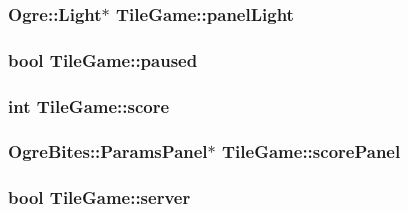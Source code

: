 \hypertarget{classTileGame_a23db72b0263e4d5595c1f170cc312185}{
\subsubsection[{panel\-Light}]{\setlength{\rightskip}{0pt plus 5cm}Ogre\-::\-Light$\ast$ Tile\-Game\-::panel\-Light\hspace{0.3cm}{\ttfamily [protected]}}}\label{classTileGame_a23db72b0263e4d5595c1f170cc312185}
\hypertarget{classTileGame_ac76eb85a5597f84146e49c92f7edc877}{
\subsubsection[{paused}]{\setlength{\rightskip}{0pt plus 5cm}bool Tile\-Game\-::paused\hspace{0.3cm}{\ttfamily [protected]}}}\label{classTileGame_ac76eb85a5597f84146e49c92f7edc877}
\hypertarget{classTileGame_abba0100f7c52d2a9ae1bfa0f5bbee4a5}{
\subsubsection[{score}]{\setlength{\rightskip}{0pt plus 5cm}int Tile\-Game\-::score\hspace{0.3cm}{\ttfamily [protected]}}}\label{classTileGame_abba0100f7c52d2a9ae1bfa0f5bbee4a5}
\hypertarget{classTileGame_a9a4d1b4dfacca55fdeacf454af04fa0c}{
\subsubsection[{score\-Panel}]{\setlength{\rightskip}{0pt plus 5cm}Ogre\-Bites\-::\-Params\-Panel$\ast$ Tile\-Game\-::score\-Panel\hspace{0.3cm}{\ttfamily [protected]}}}\label{classTileGame_a9a4d1b4dfacca55fdeacf454af04fa0c}
\hypertarget{classTileGame_a8f1f5171595cb9819f47ad2c9849e810}{
\subsubsection[{server}]{\setlength{\rightskip}{0pt plus 5cm}bool Tile\-Game\-::server\hspace{0.3cm}{\ttfamily [protected]}}}\label{classTileGame_a8f1f5171595cb9819f47ad2c9849e810}
